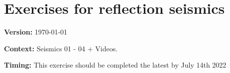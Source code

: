 \documentclass[a4paper,12pt]{article}
\begin{document}
    
    
    
    \setcounter{section}{7}
    \section{Exercises for reflection seismics}
    \textbf{Version:} \today 
    
    \textbf{Context:} Seismics 01 - 04 + Videos.
    
    \textbf{Timing:} This exercise should be completed the latest by July 14th 2022
    
   
\end{document}
